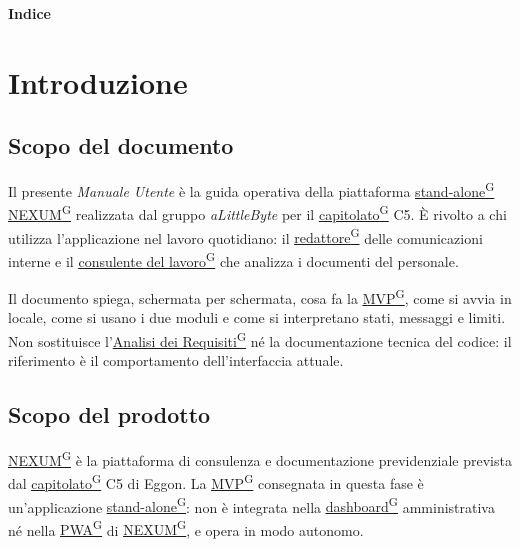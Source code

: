 \documentclass[a4paper,12pt]{article}
\providecommand{\glslink}[2]{\href{https://alittlebyte-19.github.io/Documentazione/glossario.html\#gls-#1}{\underline{#2}\textsuperscript{\scriptsize G}}}
\begin{document}
\newpage

\begin{center}
    {\Large \textbf{Indice}}
\end{center}

\vspace{0.4cm}

\tableofcontents

\newpage
{}
\hypersetup{pageanchor=true}
\setcounter{page}{4}

\section{Introduzione}

\subsection{Scopo del documento}

Il presente \textit{Manuale Utente} è la guida operativa della piattaforma \glslink{standalone}{stand-alone} \glslink{nexum}{NEXUM} realizzata dal gruppo \textit{aLittleByte} per il \glslink{capitolato}{capitolato} C5. È rivolto a chi utilizza l'applicazione nel lavoro quotidiano: il \glslink{redattore}{redattore} delle comunicazioni interne e il \glslink{consulente-del-lavoro-cdl}{consulente del lavoro} che analizza i documenti del personale.

Il documento spiega, schermata per schermata, cosa fa la \glslink{mvp-minimum-viable-product}{MVP}, come si avvia in locale, come si usano i due moduli e come si interpretano stati, messaggi e limiti. Non sostituisce l'\glslink{analisi-dei-requisiti-adr}{Analisi dei Requisiti} né la documentazione tecnica del codice: il riferimento è il comportamento dell'interfaccia attuale.

\subsection{Scopo del prodotto}

\glslink{nexum}{NEXUM} è la piattaforma di consulenza e documentazione previdenziale prevista dal \glslink{capitolato}{capitolato} C5 di Eggon. La \glslink{mvp-minimum-viable-product}{MVP} consegnata in questa fase è un'applicazione \glslink{standalone}{stand-alone}: non è integrata nella \glslink{dashboard}{dashboard} amministrativa né nella \glslink{pwa-progressive-web-app}{PWA} di \glslink{nexum}{NEXUM}, e opera in modo autonomo.
\end{document}
